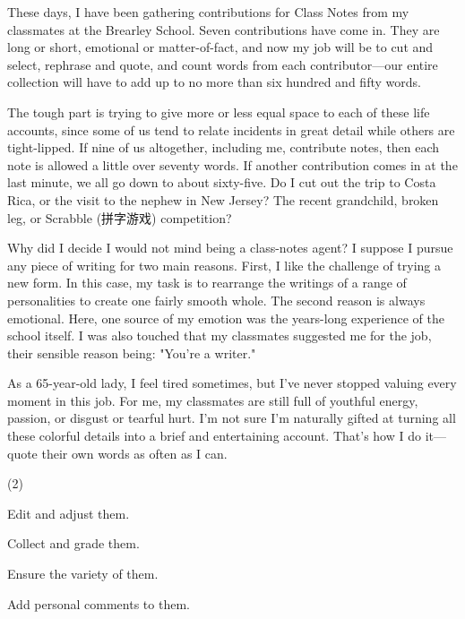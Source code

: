 \documentclass{英语试卷}
\begin{document}
\par These days, I have been gathering contributions for Class Notes from my classmates at the Brearley School. Seven contributions have come in. They are long or short, emotional or matter-of-fact, and now my job will be to cut and select, rephrase and quote, and count words from each contributor—our entire collection will have to add up to no more than six hundred and fifty words.\par
\par The tough part is trying to give more or less equal space to each of these life accounts, since some of us tend to relate incidents in great detail while others are tight-lipped. If nine of us altogether, including me, contribute notes, then each note is allowed a little over seventy words. If another contribution comes in at the last minute, we all go down to about sixty-five. Do I cut out the trip to Costa Rica, or the visit to the nephew in New Jersey? The recent grandchild, broken leg, or Scrabble (拼字游戏) competition?\par
\par Why did I decide I would not mind being a class-notes agent? I suppose I pursue any piece of writing for two main reasons. First, I like the challenge of trying a new form. In this case, my task is to rearrange the writings of a range of personalities to create one fairly smooth whole. The second reason is always emotional. Here, one source of my emotion was the years-long experience of the school itself. I was also touched that my classmates suggested me for the job, their sensible reason being: "You're a writer."\par
\par As a 65-year-old lady, I feel tired sometimes, but I've never stopped valuing every moment in this job. For me, my classmates are still full of youthful energy, passion, or disgust or tearful hurt. I'm not sure I'm naturally gifted at turning all these colorful details into a brief and entertaining account. That's how I do it—quote their own words as often as I can.\par
{}
\begin{choices}(2)
  \item Edit and adjust them.
  \item Collect and grade them.
  \item Ensure the variety of them.
  \item Add personal comments to them.
\end{choices}
\end{document}
